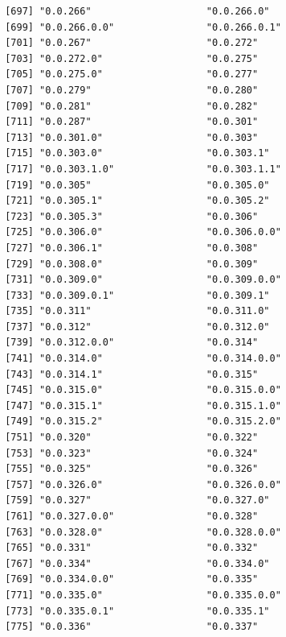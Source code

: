 \documentclass[
  letterpaper,
  DIV=11,
  numbers=noendperiod]{scrreprt}
\begin{document}
\begin{verbatim}
 [697] "0.0.266"                    "0.0.266.0"                 
 [699] "0.0.266.0.0"                "0.0.266.0.1"               
 [701] "0.0.267"                    "0.0.272"                   
 [703] "0.0.272.0"                  "0.0.275"                   
 [705] "0.0.275.0"                  "0.0.277"                   
 [707] "0.0.279"                    "0.0.280"                   
 [709] "0.0.281"                    "0.0.282"                   
 [711] "0.0.287"                    "0.0.301"                   
 [713] "0.0.301.0"                  "0.0.303"                   
 [715] "0.0.303.0"                  "0.0.303.1"                 
 [717] "0.0.303.1.0"                "0.0.303.1.1"               
 [719] "0.0.305"                    "0.0.305.0"                 
 [721] "0.0.305.1"                  "0.0.305.2"                 
 [723] "0.0.305.3"                  "0.0.306"                   
 [725] "0.0.306.0"                  "0.0.306.0.0"               
 [727] "0.0.306.1"                  "0.0.308"                   
 [729] "0.0.308.0"                  "0.0.309"                   
 [731] "0.0.309.0"                  "0.0.309.0.0"               
 [733] "0.0.309.0.1"                "0.0.309.1"                 
 [735] "0.0.311"                    "0.0.311.0"                 
 [737] "0.0.312"                    "0.0.312.0"                 
 [739] "0.0.312.0.0"                "0.0.314"                   
 [741] "0.0.314.0"                  "0.0.314.0.0"               
 [743] "0.0.314.1"                  "0.0.315"                   
 [745] "0.0.315.0"                  "0.0.315.0.0"               
 [747] "0.0.315.1"                  "0.0.315.1.0"               
 [749] "0.0.315.2"                  "0.0.315.2.0"               
 [751] "0.0.320"                    "0.0.322"                   
 [753] "0.0.323"                    "0.0.324"                   
 [755] "0.0.325"                    "0.0.326"                   
 [757] "0.0.326.0"                  "0.0.326.0.0"               
 [759] "0.0.327"                    "0.0.327.0"                 
 [761] "0.0.327.0.0"                "0.0.328"                   
 [763] "0.0.328.0"                  "0.0.328.0.0"               
 [765] "0.0.331"                    "0.0.332"                   
 [767] "0.0.334"                    "0.0.334.0"                 
 [769] "0.0.334.0.0"                "0.0.335"                   
 [771] "0.0.335.0"                  "0.0.335.0.0"               
 [773] "0.0.335.0.1"                "0.0.335.1"                 
 [775] "0.0.336"                    "0.0.337"                   

\end{verbatim}
\end{document}
